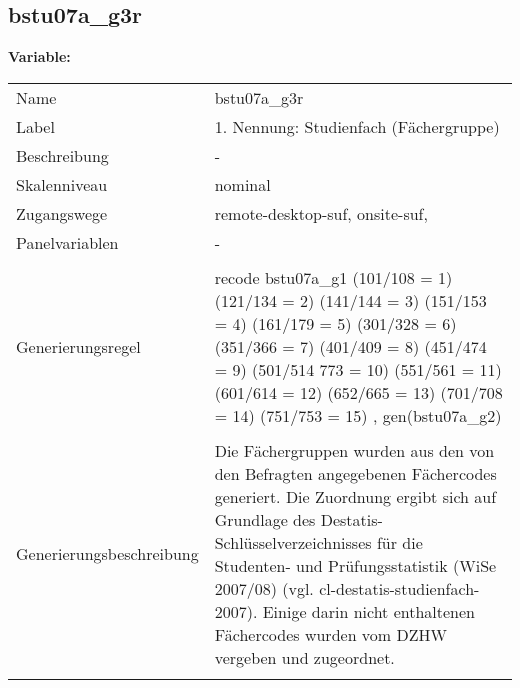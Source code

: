 	
	
	\subsection{bstu07a\_g3r}
	\label{subSection:bstu07a_g3r}

	\noindent\textbf{Variable:}\\
		\begin{tabular}{lL{11.3cm}}
			\label{tableVariable:bstu07a_g3r}
			Name & bstu07a\_g3r \\
			Label & 1. Nennung: Studienfach (Fächergruppe) \\
			Beschreibung & - \\
			Skalenniveau & nominal \\
			Zugangswege &
				remote-desktop-suf,
				onsite-suf,
 \\
			Panelvariablen & -
			 \\
			 \\
					Generierungsregel & recode bstu07a\_g1 (101/108 = 1) (121/134 = 2) (141/144 = 3) 
(151/153 = 4) (161/179 = 5) (301/328 = 6) (351/366 = 7) 
(401/409 = 8) (451/474 = 9) (501/514 773 = 10) (551/561 = 11) 
(601/614 = 12) (652/665 = 13) (701/708 = 14) (751/753 = 15)
, gen(bstu07a\_g2) \\
				 \\
					Generierungsbeschreibung & Die Fächergruppen wurden aus den von den Befragten angegebenen Fächercodes generiert. Die Zuordnung ergibt sich auf Grundlage des Destatis-Schlüsselverzeichnisses für die Studenten- und Prüfungsstatistik (WiSe 2007/08) (vgl. cl-destatis-studienfach-2007).  Einige darin nicht enthaltenen Fächercodes wurden vom DZHW vergeben und zugeordnet. 
				 \\	
			 \\
		\end{tabular}






